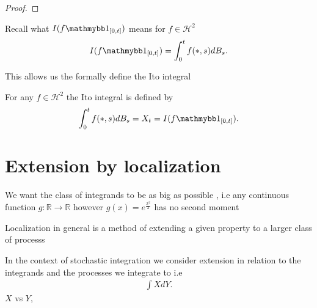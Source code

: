 \begin{proof}
  
\end{proof}
\begin{remark}
  Recall what $I(f\cha_{[0,t]})$  means for $f \in  \mathcal{H}^2$ 
  \begin{align*}
    I(f\cha_{[0,t]}) = \int_0^{t} f(*,s) dB_s  
  .\end{align*}
\end{remark}
This allows us the formally define the Ito integral 
\begin{definition}
 For any $f \in  \mathcal{H}^2$  the Ito integral is defined by 
 \begin{align*}
   \int_0^{t} f(*,s) dB_s = X_t = I(f \cha_{[0,t]})
 .\end{align*}
\end{definition}
\section{Extension by localization}
We want the class of integrands to be as big as possible , i.e any continuous function $g : \mathbb{R} \to  \mathbb{R}$ however $g(x) = e^{\frac{x^2}{2}} $  has no second moment
\begin{definition}[Localization]
  Localization in general is a method of extending a given property to a larger class of processs
\end{definition}
In the context of stochastic integration we consider extension in relation to the integrands and the processes we integrate to i.e 
\begin{align*}
  \int X dY
.\end{align*}
$X$ vs $Y$, 
